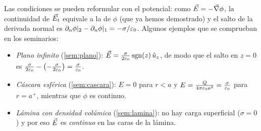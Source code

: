 

\begin{observacion}\label{obs:contorno-ejemplos}
Las condiciones se pueden reformular con el potencial: como $\vec{E}=-\vec{\nabla}\phi$, la continuidad de $\vec{E}_t$ equivale a la de $\phi$ (que ya hemos demostrado) y el salto de la
derivada normal es $\partial_n\phi|_2-\partial_n\phi|_1=-\sigma/\varepsilon_{0}$. Algunos ejemplos que se comprueban en los seminarios:
\begin{itemize}
  \item \emph{Plano infinito} (\cref{sem:plano}): $\vec{E}=\frac{\sigma}{2\varepsilon_{0}}\,\mathrm{sgn}(z)\,\hat{u}_{z}$, de modo que el salto en $z=0$ es $\frac{\sigma}{2\varepsilon_{0}}-\bigl(-\frac{\sigma}{2\varepsilon_{0}}\bigr)=\frac{\sigma}{\varepsilon_{0}}$.
  \item \emph{Cáscara esférica} (\cref{sem:cascara}): $E=0$ para $r<a$ y $E=\frac{Q}{4\pi\varepsilon_{0} a^{2}}=\frac{\sigma}{\varepsilon_{0}}$ para $r=a^{+}$, mientras que $\phi$ es continuo.
  \item \emph{Lámina con densidad volúmica} (\cref{sem:lamina}): no hay carga superficial ($\sigma=0$) y por eso $\vec{E}$ es \emph{continuo} en las caras de la lámina.
\end{itemize}
\end{observacion}
